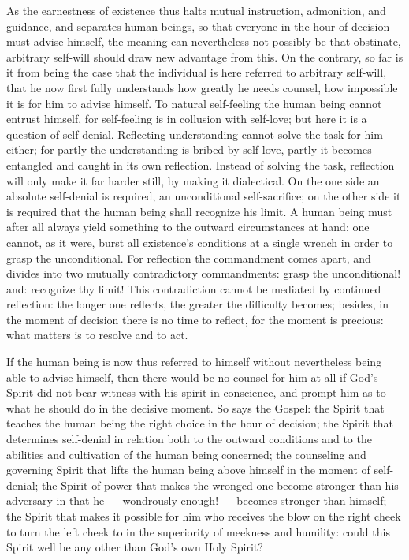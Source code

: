\documentclass[12pt,a4paper]{book}
\begin{document}
As the earnestness of existence thus halts mutual
instruction, admonition, and guidance, and separates human beings, so that everyone in
the hour of decision must advise himself, the meaning can nevertheless not possibly be
that obstinate, arbitrary self-will should draw new advantage from this. On the contrary,
so far is it from being the case that the individual is here referred to arbitrary
self-will, that he now first fully understands how greatly he needs counsel, how
impossible it is for him to advise himself. To natural self-feeling the human being
cannot entrust himself, for self-feeling is in collusion with self-love; but here it is a
question of self-denial. Reflecting understanding cannot solve the task for him either;
for partly the understanding is bribed by self-love, partly it becomes entangled and
caught in its own reflection. Instead of solving the task, reflection will only make it
far harder still, by making it dialectical. On the one side an absolute self-denial is
required, an unconditional self-sacrifice; on the other side it is required that the human
being shall recognize his limit. A human being must after all always yield something to
the outward circumstances at hand; one cannot, as it were, burst all existence's
conditions at a single wrench in order to grasp the unconditional. For reflection the
commandment comes apart, and divides into two mutually contradictory commandments: grasp
the unconditional! and: recognize thy limit! This contradiction cannot be mediated by
continued reflection: the longer one reflects, the greater the difficulty becomes;
besides, in the moment of decision there is no time to reflect, for the moment is precious:
what matters is to resolve and to act.

If the human being is now thus referred to himself without nevertheless being able to
advise himself, then there would be no counsel for him at all if God's Spirit did not bear
witness with his spirit in conscience, and prompt him as to what he should do in the
decisive moment. So says the Gospel: the Spirit that teaches the human
being the right choice in the hour of decision; the Spirit that determines self-denial in
relation both to the outward conditions and to the abilities and cultivation of the human
being concerned; the counseling and governing Spirit that lifts the human being above
himself in the moment of self-denial; the Spirit of power that makes the wronged one
become stronger than his adversary in that he --- wondrously enough! --- becomes stronger
than himself; the Spirit that makes it possible for him who receives the blow on the right
cheek to turn the left cheek to in the superiority of meekness and humility: could this
Spirit well be any other than God's own Holy Spirit?
\end{document}
